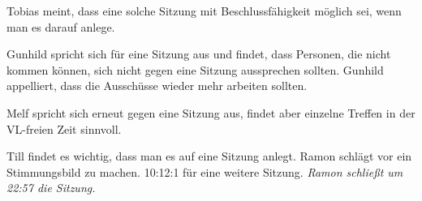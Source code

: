 \documentclass[ngerman,headheight=70pt]{scrartcl}
\begin{document}
    Tobias meint, dass eine solche Sitzung mit Beschlussfähigkeit möglich sei,
    wenn man es darauf anlege.

    Gunhild spricht sich für eine Sitzung aus und findet, dass Personen, die nicht
    kommen können, sich nicht gegen eine Sitzung aussprechen sollten.
    Gunhild appelliert, dass die Ausschüsse wieder mehr arbeiten sollten.

    Melf spricht sich erneut gegen eine Sitzung aus, findet aber einzelne
    Treffen in der VL-freien Zeit sinnvoll.

    Till findet es wichtig, dass man es auf eine Sitzung anlegt.
    Ramon schlägt vor ein Stimmungsbild zu machen. 10:12:1 für eine weitere Sitzung.
    \textit{Ramon schließt um 22:57 die Sitzung.}

    
\end{document}
